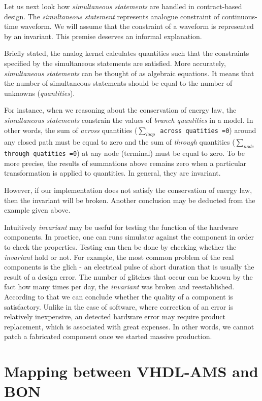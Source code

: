 \documentclass{article}
\newcommand{\inv}{\emph{invariant}\xspace}
\newcommand{\arcoss}{\emph{across}\xspace}
\newcommand{\through}{\emph{through}\xspace}
\begin{document}
Let us next look how \emph{simultaneous statements} are handled in
contract-based design.  The \emph{simultaneous statement} represents
analogue constraint of continuous-time waveform.  We will assume that
the constraint of a waveform is represented by an invariant. This
premise deserves an informal explanation.

Briefly stated, the analog kernel calculates quantities such that the
constraints specified by the simultaneous statements are satisfied.
More accurately, \emph{simultaneous statements} can be thought of as
algebraic equations.  It means that the number of simultaneous
statements should be equal to the number of unknowns
(\emph{quantities}).  

For instance, when we reasoning about the conservation of energy law,
the \emph{simultaneous statements} constrain the values of
\emph{branch quantities} in a model.  In other words, the sum of
\arcoss quantities (\texttt{$\sum_{loop}$ across quatities =0}) around
any closed path must be equal to zero and the sum of \through
quantities (\texttt{$\sum_{node}$ through quatities =0}) at any node
(terminal) must be equal to zero.  To be more precise, the results of
summations above remains zero when a particular transformation is
applied to quantities.  In general, they are invariant.

However, if our implementation does not satisfy the conservation of
energy law, then the invariant will be broken.  Another conclusion may
be deducted from the example given above.

Intuitively \inv may be useful for testing the function of the
hardware components.  In practice, one can runs simulator against the
component in order to check the properties. Testing can then be done
by checking whether the \inv hold or not.  For example, the most
common problem of the real components is the glich - an electrical
pulse of short duration that is usually the result of a design error.
The number of glitches that occur can be known by the fact how many
times per day, the \inv was broken and reestablished. According to
that we can conclude whether the quality of a component is
satisfactory. Unlike in the case of software, where correction of an
error is relatively inexpensive, an detected hardware error may
require product replacement, which is associated with great expenses.
In other words, we cannot patch a fabricated component once we started
massive production.

\section{Mapping between VHDL-AMS and BON}
\label{sec:mappingVB} 
\end{document}

